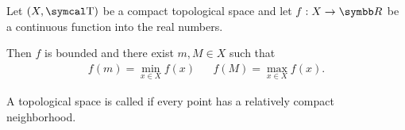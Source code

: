 \begin{theorem}\label{thm:weierstrass_extreme_value_theorem}
  Let \( (X, \CT) \) be a compact topological space and let \( f: X \to \BR \) be a continuous function into the real numbers.

  Then \( f \) is bounded and there exist \( m, M \in X \) such that
  \begin{align*}
    f(m) = \min_{x \in X} f(x)
    &&
    f(M) = \max_{x \in X} f(x).
  \end{align*}
\end{theorem}

\begin{definition}\label{def:locally_compact_space}\cite[148]{Engelking1989}
  A topological space is called  if every point has a relatively compact neighborhood.
\end{definition}
